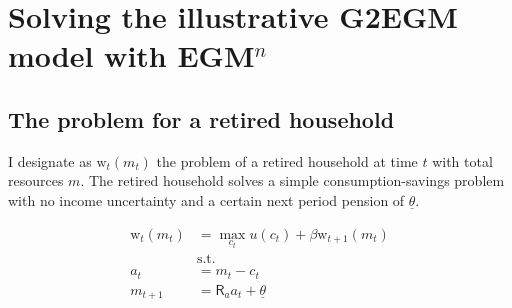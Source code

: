 \documentclass{article}
\newcommand{\DiscFac}{\beta}
\newcommand{\util}{u}
\newcommand{\tShkEmp}{\theta}
\newcommand{\cRat}{c}
\newcommand{\Rfree}{\mathsf{R}}
\newcommand{\aRat}{a}
\newcommand{\mRat}{m}
\newcommand{\wFunc}{\mathrm{w}}
\begin{document}




\section{Solving the illustrative G2EGM model with EGM$^n$}\label{appendix}

\subsection{The problem for a retired household}\label{The problem for a retired household}

I designate as $\wFunc_{t}(\mRat_{t})$ the problem of a retired household at time $t$ with total resources $\mRat$. The retired household solves a simple consumption-savings problem with no income uncertainty and a certain next period pension of $\underline{\tShkEmp}$.

\begin{equation}
\begin{split}
        \wFunc_{t}(\mRat_{t}) & = \max_{\cRat_{t}} \util(\cRat_{t}) +
        \DiscFac \wFunc_{t+1}(\mRat_{t}) \\
        & \text{s.t.} \\
        \aRat_{t} & = \mRat_{t} - \cRat_{t} \\
        \mRat_{t+1} & = \Rfree_{\aRat} \aRat_{t} +
        \underline{\tShkEmp}
    \end{split}
\end{equation}
\end{document}
